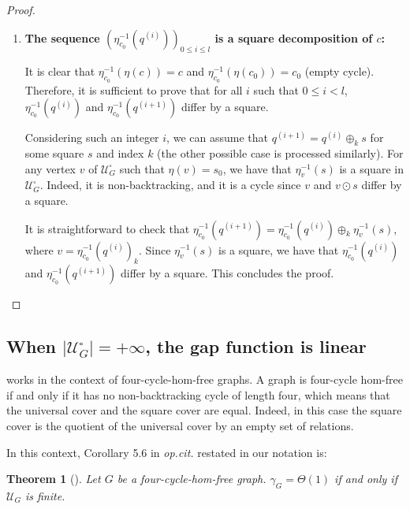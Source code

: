 \documentclass{article}
\newtheorem{theorem}{Theorem}[section]
\newcommand\quadcover[1]{\mathcal{U}^\square_{#1}}
\begin{document}
\begin{proof}
\begin{enumerate}
This is rewritten into $\eta(c) \sim_{\square} p_{l(p)}$ (empty cycle), which means that $\eta(c)$ is square-decomposable. Let us consider $(q^{(i)})_{0\le i\le l}$ a square decomposition of $\eta(c)$.

\item \textbf{The sequence $(\eta^{-1}_{c_0}(q^{(i)}))_{0\le i\le l}$ is a square decomposition of $c$:} 

It is clear that $\eta^{-1}_{c_0}(\eta(c)) = c$ and $\eta^{-1}_{c_0}(\eta(c_0)) = c_0$ (empty cycle). Therefore, it is sufficient to prove that for all $i$ such that $0\leq i < l$, $\eta^{-1}_{c_0}(q^{(i)})$ and $\eta^{-1}_{c_0}(q^{(i+1)})$ differ by a square.

Considering such an integer $i$, we can assume that $q^{(i+1)} = q^{(i)} \oplus_k s$ for some square $s$ and index $k$ (the other possible case is processed similarly). For any vertex $v$ of $\quadcover{G}$ such that $\eta(v) = s_0$, we have that $\eta^{-1}_{v}(s)$ is a square in $\quadcover{G}$. Indeed, it is non-backtracking, and it is a cycle since $v$ and $v\odot s$ differ by a square.

It is straightforward to check that $\eta^{-1}_{c_0}(q^{(i+1)}) = \eta^{-1}_{c_0}(q^{(i)}) \oplus_k \eta^{-1}_{v}(s)$, where $v =  \eta^{-1}_{c_0}(q^{(i)})_k$. Since $\eta^{-1}_{v}(s)$ is a square, we have that $\eta^{-1}_{c_0}(q^{(i)})$ and $\eta^{-1}_{c_0}(q^{(i+1)})$ differ by a square. This concludes the proof.\qedhere
\end{enumerate}
\end{proof}


\subsection{ When $|\quadcover{G}| = +\infty$, the gap function is linear\label{section.square.cover.infinite}}

\cite{CM18} works in the context of four-cycle-hom-free graphs. A graph is four-cycle hom-free if and only if it has no non-backtracking cycle of length four, which means that the universal cover and the square cover are equal. Indeed, in this case the square cover is the quotient of the universal cover by an empty set of relations.

In this context, Corollary 5.6 in \emph{op.cit.} restated in our notation is:

\begin{theorem}[\cite{CM18}]\label{thm-chandgotia}
Let $G$ be a four-cycle-hom-free graph. $\gamma_G = \Theta(1)$ if and only if $\mathcal{U}_{G}$ is finite.
\end{theorem} 
\end{document}
